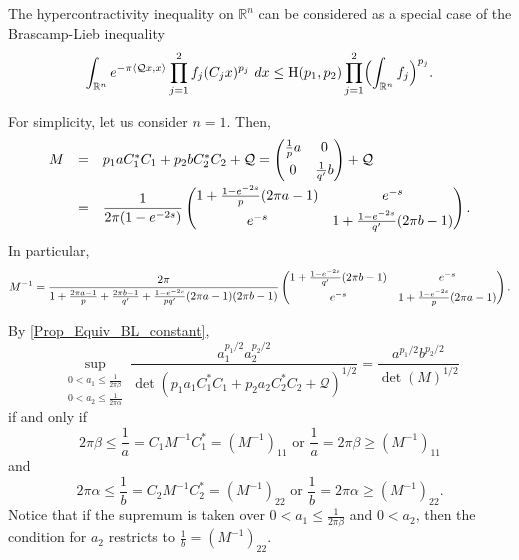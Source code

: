 \documentclass[11pt,a4paper,reqno]{amsart}
\numberwithin{equation}{section}
\theoremstyle{definition}
\newcommand{\nm}{\noalign{\smallskip}}
\newcommand{\ds}{\displaystyle}
\newcommand{\<}{\ensuremath \leq}
\renewcommand{\>}{\ensuremath \geq}
\begin{document}
The hypercontractivity inequality on $\mathbb{R}^n$ can be considered as a special case of the Brascamp-Lieb inequality $$\int_{\mathbb{R}^n}e^{-\pi \langle \mathcal{Q}x,x\rangle}\prod_{j=1}^2 f_j(C_jx)^{p_j}\ dx \leq \mathrm{H}(p_1,p_2)\prod_{j=1}^2 \Bigl( \int_{\mathbb{R}^n} f_j\Bigl)^{p_j}.$$



For simplicity, let us consider $n=1.$ 
Then, $$\begin{array}{lll}M &=& p_1aC_1^*C_1+p_2bC_2^*C_2+\mathcal{Q}=\begin{pmatrix}
    \frac{1}{p}a & 0 \\
    \nm 
    0 & \frac{1}{q'}b
\end{pmatrix}+\mathcal{Q} \\
\nm 
&=& \ds \frac{1}{2\pi(1-e^{-2s})}\begin{pmatrix}
    1+\frac{1-e^{-2s}}{p}(2\pi a-1) & e^{-s} \\
    \nm 
    e^{-s} & 1+\frac{1-e^{-2s}}{q'}(2\pi b-1)
\end{pmatrix}.
\end{array}$$
In particular, $$M^{-1}=\frac{2\pi}{ 1+\frac{2\pi a-1}{p}+\frac{2\pi b-1}{q'}+\frac{1-e^{-2s}}{pq'}(2\pi a-1)(2\pi b-1)}\begin{pmatrix}
    1+\frac{1-e^{-2s}}{q'}(2\pi b-1) & e^{-s} \\
    \nm 
    e^{-s} & 1+\frac{1-e^{-2s}}{p}(2\pi a-1)
\end{pmatrix}.$$

By \cref{Prop_Equiv_BL_constant},  \begin{equation} \label{Sup_Det_Hypercontractivity} \sup_{\substack{0<a_1 \leq \frac{1}{2\pi \beta} \\ 0<a_2 \leq \frac{1}{2\pi \alpha}}}\frac{a_1^{p_1/2}a_2^{p_2/2}}{\det(p_1a_1C_1^*C_1+p_2a_2C_2^*C_2+\mathcal{Q})^{1/2}}=\frac{a^{p_1/2}b^{p_2/2}}{\det(M)^{1/2}}\end{equation} if and only if $$2\pi \beta \leq \frac{1}{a}= C_1M^{-1}C_1^*=(M^{-1})_{11} \text{ or } \frac{1}{a}=2\pi \beta \geq (M^{-1})_{11} $$ and $$2\pi \alpha \leq \frac{1}{b} =C_2M^{-1}C_2^*=(M^{-1})_{22} \text{ or } \frac{1}{b}=2\pi \alpha \geq (M^{-1})_{22}.$$ Notice that if the supremum is taken over $0<a_1 \leq \frac{1}{2\pi \beta}$ and $0<a_2$, then the condition for $a_2$ restricts to $\frac{1}{b}=(M^{-1})_{22}.$ \hfill \\
\end{document}
